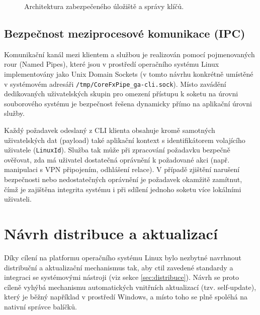 \begin{figure}[H]
    \caption{Architektura zabezpečeného úložiště a správy klíčů.}
    \label{fig:security_component}
\end{figure}

\subsection{Bezpečnost meziprocesové komunikace (IPC)}

Komunikační kanál mezi klientem a službou je realizován pomocí pojmenovaných rour (Named Pipes), které jsou v prostředí operačního systému Linux implementovány jako Unix Domain Sockets \cite{dotnet_named_pipes} (v tomto návrhu konkrétně umístěné v systémovém adresáři \texttt{/tmp/\allowbreak{}CoreFxPipe\_ga-cli.sock}). Místo zavádění dedikovaných uživatelských skupin pro omezení přístupu k soketu na úrovni souborového systému je bezpečnost řešena dynamicky přímo na aplikační úrovni služby.

Každý požadavek odeslaný z CLI klienta obsahuje kromě samotných uživatelských dat (payload) také aplikační kontext s identifikátorem volajícího uživatele (\texttt{LinuxId}). Služba tak může při zpracování požadavku bezpečně ověřovat, zda má uživatel dostatečná oprávnění k požadované akci (např. manipulaci s VPN připojením, odhlášení relace). V případě zjištění narušení bezpečnosti nebo nedostatečných oprávnění je požadavek okamžitě zamítnut, čímž je zajištěna integrita systému i při sdílení jednoho soketu více lokálními uživateli.

\section{Návrh distribuce a aktualizací}
\label{sec:distribuce_aktualizace}

Díky cílení na platformu operačního systému Linux bylo nezbytné navrhnout distribuční a aktualizační mechanismus tak, aby ctil zavedené standardy a integraci se systémovými nástroji (viz sekce \ref{sec:distribuce}). Návrh se proto cíleně vyhýbá mechanismu automatických vnitřních aktualizací (tzv. self-update), který je běžný například v prostředí Windows, a místo toho se plně spoléhá na nativní správce balíčků.


